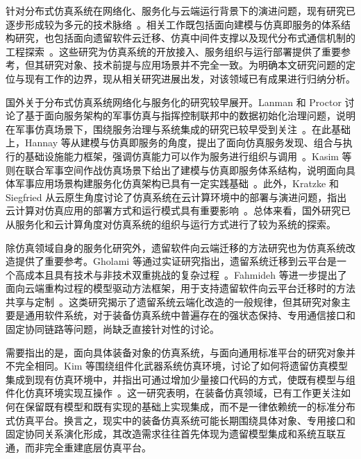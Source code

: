 \documentclass[lang=chs, degree=master, blindreview=true, winfonts=true, academic=false]{yanputhesis}
\begin{document}
针对分布式仿真系统在网络化、服务化与云端运行背景下的演进问题，现有研究已逐步形成较为多元的技术脉络~\cite{TAYLOR20191,WAINER20081266}。相关工作既包括面向建模与仿真即服务的体系结构研究，也包括面向遗留软件云迁移、仿真中间件支撑以及现代分布式通信机制的工程探索~\cite{HASAN2023111702,FAHMIDEH2022106795}。这些研究为仿真系统的开放接入、服务组织与运行部署提供了重要参考，但其研究对象、技术前提与应用场景并不完全一致。为明确本文研究问题的定位与现有工作的边界，现从相关研究进展出发，对该领域已有成果进行归纳分析。

国外关于分布式仿真系统网络化与服务化的研究较早展开。Lanman 和 Proctor 讨论了基于面向服务架构的军事仿真与指挥控制联邦中的数据初始化治理问题，说明在军事仿真场景下，围绕服务治理与系统集成的研究已较早受到关注~\cite{Lanman2009SOAMilitarySim}。在此基础上，Hannay 等从建模与仿真即服务的角度，提出了面向仿真服务发现、组合与执行的基础设施能力框架，强调仿真能力可以作为服务进行组织与调用~\cite{Hannay2021MSaaSInfrastructure}。Kasim 等则在联合军事空间作战仿真场景下给出了建模与仿真即服务体系结构，说明面向具体军事应用场景构建服务化仿真架构已具有一定实践基础~\cite{Kasim2021MSaaSSpaceOps}。此外，Kratzke 和 Siegfried 从云原生角度讨论了仿真系统在云计算环境中的部署与演进问题，指出云计算对仿真应用的部署方式和运行模式具有重要影响~\cite{Kratzke2021CloudNativeSimulation}。总体来看，国外研究已从服务化和云计算角度对仿真系统的组织与运行方式进行了较为系统的探索。

除仿真领域自身的服务化研究外，遗留软件向云端迁移的方法研究也为仿真系统改造提供了重要参考。Gholami 等通过实证研究指出，遗留系统迁移到云平台是一个高成本且具有技术与非技术双重挑战的复杂过程~\cite{Gholami2017LegacyToCloud}。Fahmideh 等进一步提出了面向云端重构过程的模型驱动方法框架，用于支持遗留软件向云平台迁移时的方法共享与定制~\cite{FAHMIDEH2022106795}。这类研究揭示了遗留系统云端化改造的一般规律，但其研究对象主要是通用软件系统，对于装备仿真系统中普遍存在的强状态保持、专用通信接口和固定协同链路等问题，尚缺乏直接针对性的讨论。

需要指出的是，面向具体装备对象的仿真系统，与面向通用标准平台的研究对象并不完全相同。Kim 等围绕组件化武器系统仿真环境，讨论了如何将遗留仿真模型集成到现有仿真环境中，并指出可通过增加少量接口代码的方式，使既有模型与组件化仿真环境实现互操作~\cite{Kim2013LegacyWeaponSim}。这一研究表明，在装备仿真领域，已有工作更关注如何在保留既有模型和既有实现的基础上实现集成，而不是一律依赖统一的标准分布式仿真平台。换言之，现实中的装备仿真系统可能长期围绕具体对象、专用接口和固定协同关系演化形成，其改造需求往往首先体现为遗留模型集成和系统互联互通，而非完全重建底层仿真平台。
\end{document}
